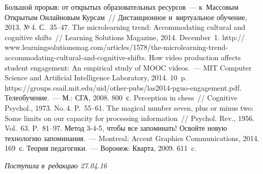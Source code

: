 \begin{multicols}{2}
{\small\frenchspacing
 {%
 \begin{thebibliography}{9}
 Большой прорыв: от открытых образовательных 
ресурсов~--- к~Массовым Открытым Онлайновым Курсам~// Дистанционное 
и~виртуальное обучение, 2013. №\,4. С.~35--47.
 The microlearning trend: Accommodating cultural and 
cognitive shifts~// Learning Solutions Magazine, 2014. December~1. {\sf 
http:// www.learningsolutionsmag.com/articles/1578/the-microlearning-trend-accommodating-cultural-and-cognitive-shifts}.
 How video production affects student 
engagement: An empirical study of MOOC videos.~--- MIT Computer Science 
and Artificial Intelligence Laboratory, 2014. 10~p. {\sf 
https://groups.csail.mit.edu/uid/other-pubs/las2014-pguo-engagement.pdf}.
 Телеобучение.~--- М.: СГА, 2008. 800~с.
 Perception in chess~// Cognitive Psychol., 
1973. No.\,4. P.~55--61.
 The magical number seven, plus or minus two: Some limits on 
our capacity for processing information~// Psychol. Rev., 1956. Vol.~63. 
P.~81--97.
 Метод 3-4-5, чтобы все запоминать! Освойте новую 
технологию запоминания.~--- Montreal: Accent Graphics Communications, 
2014. 169~с.
 Теория педагогики.~--- Воронеж: 
Кварта, 2009. 611~c.
\end{thebibliography}

 }
 }

\end{multicols}

\vspace*{-6pt}

\hfill{\small\textit{Поступила в~редакцию 27.04.16}}


\newpage

\vspace*{-24pt}







\def\tit{WHAT IS BEHIND THE~CONCEPT OF~``KNOWLEDGE IN~SMALL 
PACKAGES''}

